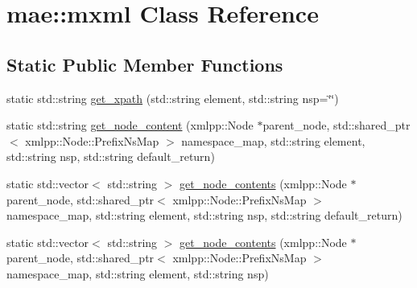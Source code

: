 \hypertarget{classmae_1_1mxml}{\section{mae\-:\-:mxml Class Reference}
\label{classmae_1_1mxml}
}
\subsection*{Static Public Member Functions}
\begin{DoxyCompactItemize}
\item 
static std\-::string \hyperlink{classmae_1_1mxml_a4c3effb837a6ec4986ee453b9b97e2d3}{get\-\_\-xpath} (std\-::string element, std\-::string nsp=\char`\"{}\char`\"{})
\item 
static std\-::string \hyperlink{classmae_1_1mxml_a0331c2eadd340faec16a00b6904e334d}{get\-\_\-node\-\_\-content} (xmlpp\-::\-Node $\ast$parent\-\_\-node, std\-::shared\-\_\-ptr$<$ xmlpp\-::\-Node\-::\-Prefix\-Ns\-Map $>$ namespace\-\_\-map, std\-::string element, std\-::string nsp, std\-::string default\-\_\-return)
\item 
static std\-::vector$<$ std\-::string $>$ \hyperlink{classmae_1_1mxml_a79614080bcde4585cf3f46421dac644d}{get\-\_\-node\-\_\-contents} (xmlpp\-::\-Node $\ast$parent\-\_\-node, std\-::shared\-\_\-ptr$<$ xmlpp\-::\-Node\-::\-Prefix\-Ns\-Map $>$ namespace\-\_\-map, std\-::string element, std\-::string nsp, std\-::string default\-\_\-return)
\item 
static std\-::vector$<$ std\-::string $>$ \hyperlink{classmae_1_1mxml_a2b5a44e784e26b6de4817f581c3f8bd4}{get\-\_\-node\-\_\-contents} (xmlpp\-::\-Node $\ast$parent\-\_\-node, std\-::shared\-\_\-ptr$<$ xmlpp\-::\-Node\-::\-Prefix\-Ns\-Map $>$ namespace\-\_\-map, std\-::string element, std\-::string nsp)
\end{DoxyCompactItemize}


